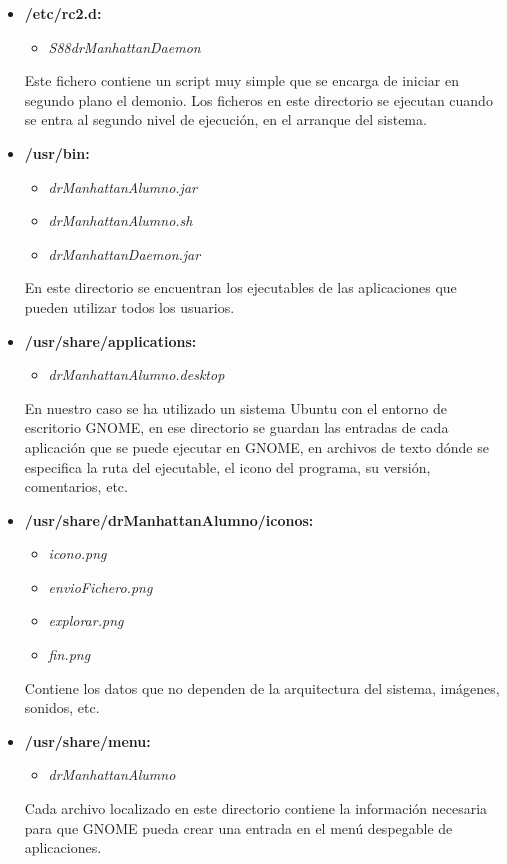 \begin{itemize}

    \item {\bfseries /etc/rc2.d:}
    \begin{itemize}
        \item \emph{S88drManhattanDaemon}
    \end{itemize}

    Este fichero contiene un script muy simple que se encarga de iniciar en segundo plano el demonio. Los ficheros en este directorio se ejecutan cuando se entra al segundo nivel de ejecución, en el arranque del sistema.


    \item {\bfseries /usr/bin:}
    \begin{itemize}
        \item \emph{drManhattanAlumno.jar}
        \item \emph{drManhattanAlumno.sh}
        \item \emph{drManhattanDaemon.jar}
    \end{itemize}

    En este directorio se encuentran los ejecutables de las aplicaciones que pueden utilizar todos los usuarios.

    \item {\bfseries /usr/share/applications:}
    \begin{itemize}
        \item \emph{drManhattanAlumno.desktop}
    \end{itemize}

    En nuestro caso se ha utilizado un sistema Ubuntu con el entorno de escritorio GNOME, en ese directorio se guardan las entradas de cada aplicación que se puede ejecutar en GNOME, en archivos de texto dónde se especifica la ruta del ejecutable, el icono del programa, su versión, comentarios, etc.


    \item {\bfseries /usr/share/drManhattanAlumno/iconos:}
    \begin{itemize}
        \item \emph{icono.png}
        \item \emph{envioFichero.png}
        \item \emph{explorar.png}
        \item \emph{fin.png}
    \end{itemize}

    Contiene los datos que no dependen de la arquitectura del sistema, imágenes, sonidos, etc.

    \item {\bfseries /usr/share/menu:}
        \begin{itemize}
            \item \emph{drManhattanAlumno}
        \end{itemize}

    Cada archivo localizado en este directorio contiene la información necesaria para que GNOME pueda crear una entrada en el menú despegable de aplicaciones.


\end{itemize}
